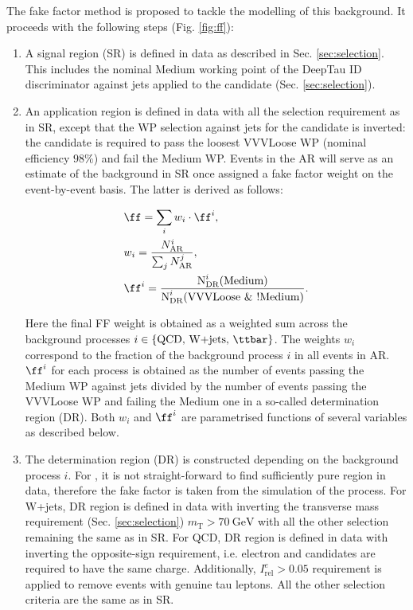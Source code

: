 The fake factor method is proposed to tackle the modelling of this background. It proceeds with the following steps (Fig. \ref{fig:ff}):
\begin{enumerate}
    \item A signal region (SR) is defined in data as described in Sec. \ref{sec:selection}. This includes the nominal Medium working point of the DeepTau ID discriminator against jets applied to the \tauh candidate (Sec. \ref{sec:selection}).
    
    \item An application region is defined in data with all the selection requirement as in SR, except that the WP selection against jets for the \tauh candidate is inverted: the candidate is required to pass the loosest VVVLoose WP (nominal \tauh efficiency $98\%$) and fail the Medium WP. Events in the AR will serve as an estimate of the \jtt background in SR once assigned a fake factor weight \ff on the event-by-event basis. The latter is derived as follows:
    
    \begin{align}
        &\ff = \sum_{i}w_i \cdot \ff^i,\\ \label{eq:ff}
        &w_i = \dfrac{N^i_\text{AR}}{\sum_j N^j_\text{AR}},\\ \label{eq:ff_fr}
        & \ff^i = \dfrac{\text{N}_{\text{DR}}^i(\text{Medium})}{\text{N}_{\text{DR}}^i(\text{VVVLoose} ~\& ~!\text{Medium})}.
    \end{align}

    Here the final FF weight is obtained as a weighted sum across the \jtt background processes $i \in \{\text{QCD, W+jets, } \ttbar\}$. The weights $w_i$ correspond to the fraction of the background process $i$ in all \jtt events in AR. $\ff^i$ for each process is obtained as the number of events passing the Medium WP against jets divided by the number of events passing the VVVLoose WP and failing the Medium one in a so-called determination region (DR). Both $w_i$ and $\ff^i$ are parametrised functions of several variables as described below. 
    
    \item The determination region (DR) is constructed depending on the background process $i$. For \ttbar, it is not straight-forward to find sufficiently pure region in data, therefore the fake factor is taken from the simulation of the \ttbar process. For W+jets, DR region is defined in data with inverting the transverse mass requirement (Sec. \ref{sec:selection}) $m_\text{T} > 70 ~\text{GeV}$ with all the other selection remaining the same as in SR. For QCD, DR region is defined in data with inverting the opposite-sign requirement, i.e. electron and \tauh candidates are required to have the same charge. Additionally, $I^e_{\text{rel}} > 0.05$ requirement is applied to remove events with genuine tau leptons. All the other selection criteria are the same as in SR.
    

\end{enumerate}
